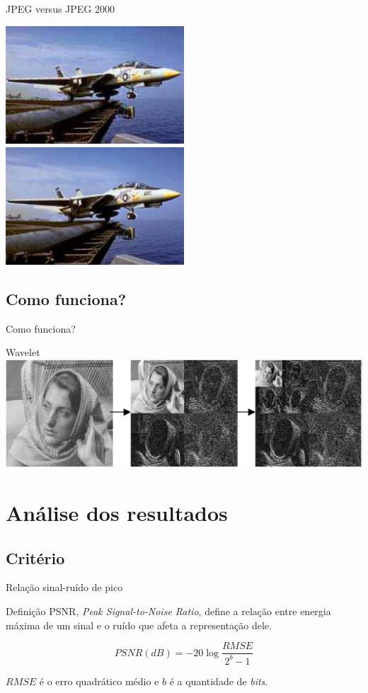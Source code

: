 \documentclass{beamer}
\begin{document}
  \begin{frame}{JPEG versus JPEG 2000}
    \begin{multicols}{2}
      \includegraphics[width=0.5\textwidth]{figure/ex_jpeg_02_1.jpg}
      \includegraphics[width=0.5\textwidth]{figure/ex_jpeg2k_02_2.jpg}
    \end{multicols}
  \end{frame}
  \subsection{Como funciona?}
  \begin{frame}{Como funciona?}

  \end{frame}
  \begin{frame}{Wavelet}
    \includegraphics[width=\textwidth]{figure/wavelet-1.jpg}
  \end{frame}
  \section{Análise dos resultados}
  \subsection{Critério}
  \begin{frame}{Relação sinal-ruído de pico}
    \begin{block}{Definição}
      PSNR, \emph{Peak Signal-to-Noise Ratio}, define a relação entre energia máxima de um sinal e o ruído que afeta a representação dele.

      $$ PSNR(dB) = -20 \log \frac{RMSE}{2^b -1} $$

      $RMSE$ é o erro quadrático médio e $b$ é a quantidade de \emph{bits}.
    \end{block}
  \end{frame}
\end{document}
